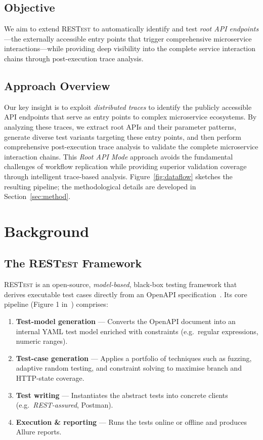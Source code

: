 \documentclass[conference]{IEEEtran}
\begin{document}
\subsection*{Objective}
We aim to extend \textsc{RESTest} to automatically identify and test \emph{root API endpoints}—the externally accessible entry points that trigger comprehensive microservice interactions—while providing deep visibility into the complete service interaction chains through post-execution trace analysis.

\subsection*{Approach Overview}
Our key insight is to exploit \emph{distributed traces} to identify the publicly accessible API endpoints that serve as entry points to complex microservice ecosystems. By analyzing these traces, we extract root APIs and their parameter patterns, generate diverse test variants targeting these entry points, and then perform comprehensive post-execution trace analysis to validate the complete microservice interaction chains. This \emph{Root API Mode} approach avoids the fundamental challenges of workflow replication while providing superior validation coverage through intelligent trace-based analysis. Figure~\ref{fig:dataflow} sketches the resulting pipeline; the methodological details are developed in Section~\ref{sec:method}.




\section{Background}


\subsection{The \textsc{RESTest} Framework}\label{sec:restest}
\textsc{RESTest} is an open-source, \emph{model-based}, black-box
testing framework that derives executable test cases directly from an
OpenAPI specification~\cite{martin2019restest}.  
Its core pipeline (Figure 1 in~\cite{martin2019restest}) comprises:

\begin{enumerate}[leftmargin=*,label=\arabic*)]
  \item \textbf{Test-model generation} — Converts the OpenAPI document
        into an internal YAML test model enriched with
        constraints (e.g.\ regular expressions, numeric ranges).
  \item \textbf{Test-case generation} — Applies a portfolio of
        techniques such as fuzzing, adaptive random testing, and
        constraint solving to maximise branch and HTTP-state coverage.
  \item \textbf{Test writing} — Instantiates the abstract tests into
        concrete clients (e.g.\ \textit{REST-assured}, Postman).
  \item \textbf{Execution \& reporting} — Runs the tests online or
        offline and produces Allure reports.
\end{enumerate}
\end{document}
